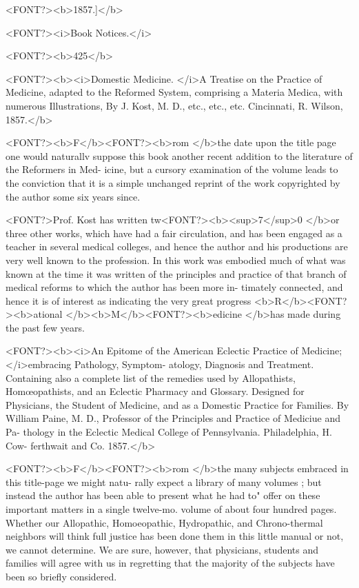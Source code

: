 <FONT?><b>1857.]</b>

<FONT?><i>Book Notices.</i>

<FONT?><b>425</b>

<FONT?><b><i>Domestic Medicine. </i>A Treatise on the Practice of Medicine, adapted to the Reformed
System, comprising a Materia Medica, with numerous Illustrations, By J. Kost, M. D.,
etc., etc., etc.   Cincinnati, R. Wilson, 1857.</b>

<FONT?><b>F</b><FONT?><b>rom </b>the date upon the title page one would naturallv suppose this
book another recent addition to the literature of the Reformers in Med-
icine, but a cursory examination of the volume leads to the conviction
that it is a simple unchanged reprint of the work copyrighted by the
author some six years since.

<FONT?>Prof. Kost has written tw<FONT?><b><sup>7</sup>0 </b>or three other works, which have had
a fair circulation, and has been engaged as a teacher in several
medical colleges, and hence the author and his productions are very
well known to the profession. In this work was embodied much of what
was known at the time it was written of the principles and practice of
that branch of medical reforms to which the author has been more in-
timately connected, and hence it is of interest as indicating the very
great progress <b>R</b><FONT?><b>ational </b><b>M</b><FONT?><b>edicine </b>has made during the past few years.

<FONT?><b><i>An Epitome of the American Eclectic Practice of Medicine; </i>embracing Pathology, Symptom-
atology, Diagnosis and Treatment. Containing also a complete list of the remedies used
by Allopathists, Homœopathists, and an Eclectic Pharmacy and Glossary. Designed
for Physicians, the Student of Medicine, and as a Domestic Practice for Families. By
William Paine, M. D., Professor of the Principles and Practice of Mediciue and Pa-
thology in the Eclectic Medical College of Pennsylvania. Philadelphia, H. Cow-
ferthwait and Co. 1857.</b>

<FONT?><b>F</b><FONT?><b>rom </b>the many subjects embraced in this title-page we might natu-
rally expect a library of many volumes ; but instead the author has been
able to present what he had to" offer on these important matters in a
single twelve-mo. volume of about four hundred pages. Whether our
Allopathic, Homoeopathic, Hydropathic, and Chrono-thermal neighbors
will think full justice has been done them in this little manual or not,
we cannot determine. We are sure, however, that physicians, students
and families will agree with us in regretting that the majority of the
subjects have been so briefly considered.

